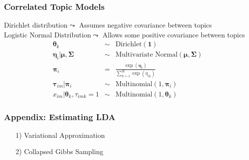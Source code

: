 \documentclass{beamer}
\numberwithin{equation}{section}
\begin{document}
\begin{frame}
\frametitle{Correlated Topic Models}

Dirichlet distribution$\leadsto$ Assumes negative covariance between topics\\
\alert{Logistic Normal Distribution}$\leadsto$ Allows some positive covariance between topics\\

\begin{eqnarray}
\boldsymbol{\theta}_{k} & \sim & \text{Dirichlet}(\boldsymbol{1}) \nonumber \\
\boldsymbol{\eta}_{i}| \boldsymbol{\mu}, \boldsymbol{\Sigma} & \sim & \text{Multivariate Normal}(\boldsymbol{\mu}, \boldsymbol{\Sigma}) \nonumber \\
\boldsymbol{\pi}_{i}  & = & \frac{\exp\left(\boldsymbol{\eta}_{i}\right)}{\sum_{k=1}^{K} \exp\left(\eta_{ik}\right)} \nonumber \\
\boldsymbol{\tau}_{im} | \boldsymbol{\pi}_{i} & \sim & \text{Multinomial}(1, \boldsymbol{\pi}_{i}) \nonumber \\
x_{im} | \boldsymbol{\theta}_{k}, \tau_{imk} = 1 & \sim & \text{Multinomial}(1, \boldsymbol{\theta}_{k}) \nonumber
\end{eqnarray}



\end{frame}



\begin{frame}
\frametitle{Appendix: Estimating LDA}

\begin{itemize}
\item[1)] Variational Approximation
\item[2)] Collapsed Gibbs Sampling
\end{itemize}

\end{frame}
\end{document}
